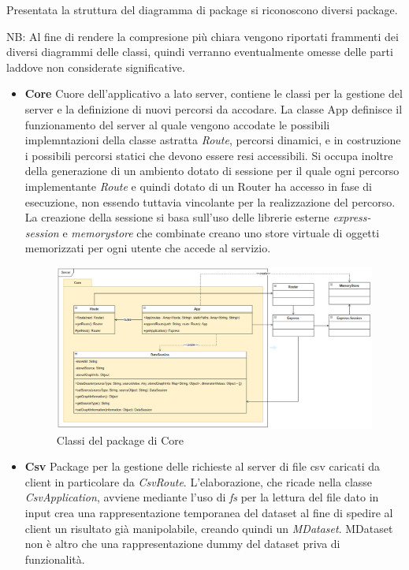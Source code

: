 \documentclass[../manuale_sviluppatore.tex]{subfiles}
\begin{document}
\par Presentata la struttura del diagramma di package si riconoscono diversi package.

NB: Al fine di rendere la compresione più chiara vengono riportati frammenti dei diversi diagrammi delle classi, 
quindi verranno eventualmente omesse delle parti laddove non considerate significative.

\begin{itemize}
	
	\item \textbf{Core} Cuore dell'applicativo a lato server, contiene le classi per la gestione del server
	e la definizione di nuovi percorsi da accodare. La classe App definisce il funzionamento del server al quale
	vengono accodate le possibili implemntazioni della classe astratta \emph{Route}, percorsi dinamici,
	e in costruzione i possibili percorsi statici che devono essere resi accessibili. Si occupa inoltre della
	generazione di un ambiento dotato di sessione per il quale ogni percorso implementante \emph{Route} e quindi dotato
	di un Router ha accesso in fase di esecuzione, non essendo tuttavia vincolante per la realizzazione del percorso.
	La creazione della sessione si basa sull'uso delle librerie esterne \emph{express-session} e \emph{memorystore}
	che combinate creano uno store virtuale di oggetti memorizzati per ogni utente che accede al servizio.
		
	\begin{figure}[H]
		\centering
		\includegraphics[width=18cm]{img/server-core.png}
		\caption{Classi del package di Core}
	\end{figure}

	\item \textbf{Csv} Package per la gestione delle richieste al server di file csv caricati da client in particolare da \emph{CsvRoute}.
	L'elaborazione, che ricade nella classe \emph{CsvApplication}, avviene mediante l'uso di \emph{fs} per la lettura del file dato in input
	crea una rappresentazione temporanea del dataset al fine di spedire al client un risultato già manipolabile, creando quindi un \emph{MDataset}.
	MDataset non è altro che una rappresentazione dummy del dataset priva di funzionalità.
	

\end{itemize}
\end{document}
